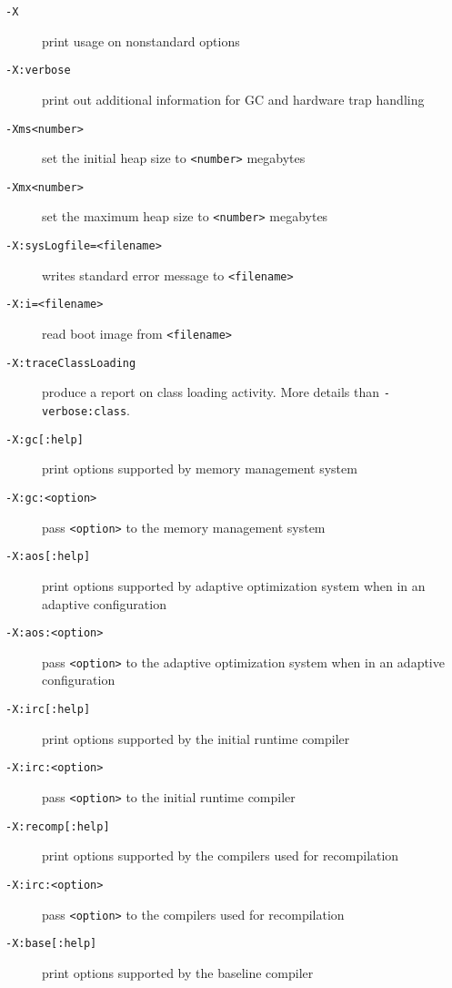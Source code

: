 \begin{description}
\item [{\tt -X}]
print usage on nonstandard options

\item[{\tt -X:verbose}]
print out additional information for GC and hardware trap handling

\item[{\tt -Xms<number>}]
set the initial heap size to {\tt <number>} megabytes

\item[{\tt -Xmx<number>}]
set the maximum heap size to {\tt <number>} megabytes

\item[{\tt -X:sysLogfile=<filename>}]
writes standard error message to {\tt <filename>}

\item[{\tt -X:i=<filename>}]
read boot image from {\tt <filename>}

\item[{\tt -X:traceClassLoading}]
produce a report on class loading activity. More details than 
{\tt -verbose:class}. 

\item[{\tt -X:gc[:help]}]
print options supported by memory management system

\item[{\tt -X:gc:<option>}]
pass {\tt <option>} to the memory management system

\item[{\tt -X:aos[:help]}]
print options supported by adaptive optimization system when in an
adaptive configuration

\item[{\tt -X:aos:<option>}]
pass {\tt <option>} to the adaptive optimization system when in an adaptive configuration

\item[{\tt -X:irc[:help]}]
print options supported by the initial runtime compiler

\item[{\tt -X:irc:<option>}]
pass {\tt <option>} to the initial runtime compiler

\item[{\tt -X:recomp[:help]}]
print options supported by the compilers used for recompilation

\item[{\tt -X:irc:<option>}]
pass {\tt <option>} to the compilers used for recompilation

\item[{\tt -X:base[:help]}]
print options supported by the baseline compiler


\end{description}
